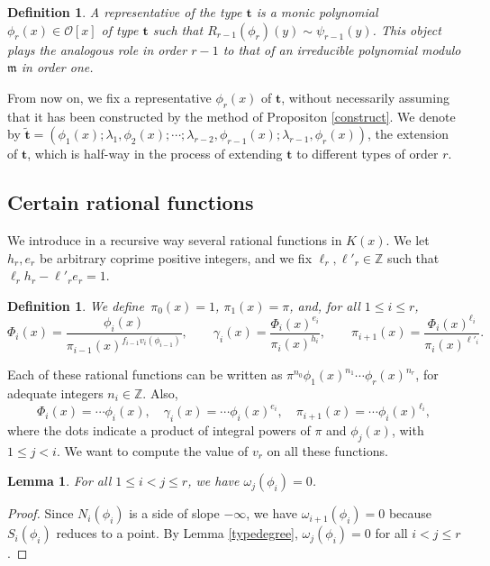 \documentclass{amsart}
\newtheorem{lemma}[theorem]{Lemma}
\newtheorem{definition}[theorem]{Definition}
\newcommand{\Z}{\mathbb Z}
\def\ga{\gamma}
\def\la{\lambda}
\def\m{{\mathfrak m}}
\def\om{\omega}
\def\oo{{\mathcal O}}
\def\ty{\mathbf{t}}
\def\zpx{\oo[x]}
\newcounter{cs}
\begin{document}
\begin{definition}
A \emph{representative} of the type $\ty$ is a monic polynomial $\phi_r(x)\in\zpx$ of type $\ty$ such that $R_{r-1}(\phi_r)(y)\sim\psi_{r-1}(y)$. This object plays the analogous role in order $r-1$ to that of an irreducible polynomial modulo $\m$ in order one.
\end{definition}

From now on, we fix a representative $\phi_r(x)$ of $\ty$, without necessarily assuming that it has been constructed by the method of Propositon \ref{construct}. We denote by  $\tilde{\ty}=(\phi_1(x);\la_1,\phi_2(x);\cdots;\la_{r-2},\phi_{r-1}(x);\la_{r-1},\phi_r(x))$, the extension of $\ty$, which is half-way in the process of extending $\ty$ to different types of order $r$.
 
\subsection{Certain rational functions}
We introduce in a recursive way several rational functions in $K(x)$. We let $h_r,e_r$ be arbitrary coprime positive integers, and we fix $\ell_r,\ell'_r\in\Z$ such that $\ell_rh_r-\ell'_re_r=1$.
\begin{definition}\label{ratfracs}
We define $\,\pi_0(x)=1$, $\pi_1(x)=\pi$, and, for all $1\le i\le r$, 
$$
\Phi_i(x)=\dfrac{\phi_i(x)}{\pi_{i-1}(x)^{f_{i-1}v_i(\phi_{i-1})}},\qquad 
\ga_i(x)=\dfrac{\Phi_i(x)^{e_i}}{\pi_i(x)^{h_i}},\qquad 
\pi_{i+1}(x)=\dfrac{\Phi_i(x)^{\ell_i}}{\pi_i(x)^{\ell'_i}}.
$$
\end{definition}

Each of these rational functions can be written as
$\pi^{n_0}\phi_1(x)^{n_1}\cdots\phi_r(x)^{n_r}$, for adequate integers $n_i\in\Z$. Also, 
\begin{equation}\label{phii}
\Phi_i(x)=\cdots\phi_i(x),\quad \ga_i(x)=\cdots \phi_i(x)^{e_i},\quad\pi_{i+1}(x)=\cdots \phi_i(x)^{\ell_i},
\end{equation}
where the dots indicate a product of integral powers of $\pi$ and $\phi_j(x)$, with $1\le j<i$.  
We want to compute the value of $v_r$ on all these functions.

\begin{lemma}\label{omji}For all $1\le i<j\le r$, we have $\om_j(\phi_i)=0$.
\end{lemma}

\begin{proof}
Since $N_i(\phi_i)$ is a side of slope $-\infty$, we have $\om_{i+1}(\phi_i)=0$ because $S_i(\phi_i)$ reduces to a point. By Lemma \ref{typedegree}, $\om_j(\phi_i)=0$ for all $i<j\le r$.
\end{proof}
\end{document}
